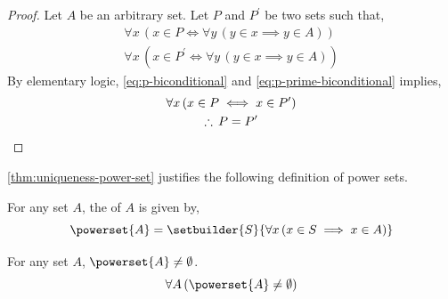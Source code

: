 \begin{proof}
    Let \( A \) be an arbitrary set. Let \( P \) and \( P^{\prime} \) be two sets
    such that,
    \begin{gather}
        \forall x \, ( x \in P \iff \forall y \, ( y \in x \implies y \in A ) ) \label{eq:p-biconditional} \\
        \forall x \, ( x \in P^{\prime} \iff \forall y \, ( y \in x \implies y \in A ) ) \label{eq:p-prime-biconditional}
    \end{gather}
    By elementary logic, \eqref{eq:p-biconditional} and \eqref{eq:p-prime-biconditional} implies,
    \begin{gather*}
        \forall x \, ( x \in P \iff x \in P^{\prime} ) \\
        \therefore \, P = P^{\prime} \qedhere
    \end{gather*}
\end{proof}

\vspace{0.3cm}
\noindent\cref{thm:uniqueness-power-set} justifies the following definition of power sets.

\begin{dfn}
    \label{dfn:power-set}
    For any set \( A \), the  of \( A \) is given by,
    \begin{equation*}
        \powerset{A} = \setbuilder{S}{\forall x \, \mleft( x \in S \implies x \in A \mright)}
    \end{equation*}
\end{dfn}

\begin{thm}
    \label{thm:power-set-is-always-non-empty}
    For any set \( A \), \( \powerset{A} \neq \emptyset \).
    \begin{equation*}
        \forall A \, ( \powerset{A} \neq \emptyset )
    \end{equation*}
\end{thm}

